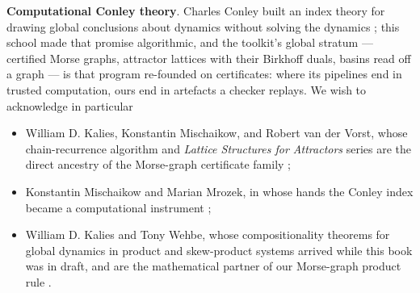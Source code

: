 
\item \textbf{Computational Conley theory}. Charles Conley built an
  index theory for drawing global conclusions about dynamics without
  solving the dynamics \cite{conley1978}; this school made that
  promise algorithmic, and the toolkit's global stratum --- certified
  Morse graphs, attractor lattices with their Birkhoff duals, basins
  read off a graph --- is that program re-founded on certificates:
  where its pipelines end in trusted computation, ours end in
  artefacts a checker replays. We wish to acknowledge in particular
  \begin{itemize}
    \item William D. Kalies, Konstantin Mischaikow, and Robert
      van der Vorst, whose chain-recurrence algorithm and
      \emph{Lattice Structures for Attractors} series are the direct
      ancestry of the Morse-graph certificate family
      \cite{kmv2005,kmv2016,kmv2022};
    \item Konstantin Mischaikow and Marian Mrozek, in whose hands the
      Conley index became a computational instrument
      \cite{mischaikowmrozek2002};
    \item William D. Kalies and Tony Wehbe, whose compositionality
      theorems for global dynamics in product and skew-product
      systems arrived while this book was in draft, and are the
      mathematical partner of our Morse-graph product rule
      \cite{kalieswehbe2026}.
  \end{itemize}
